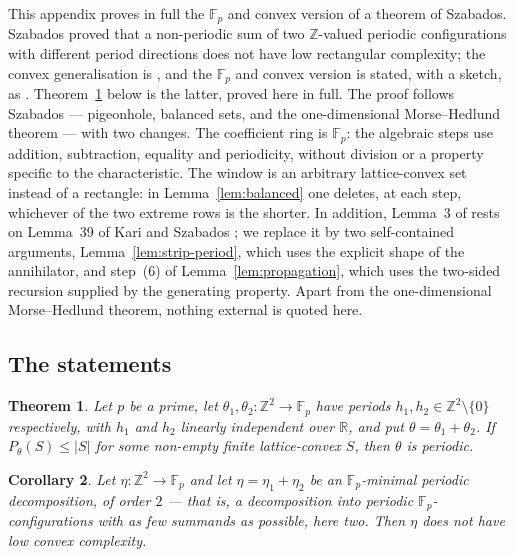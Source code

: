 \documentclass[11pt,reqno]{amsart}
\theoremstyle{plain}
\newtheorem{thm}{Theorem}[section]
\newtheorem{cor}[thm]{Corollary}
\theoremstyle{definition}
\theoremstyle{remark}
\theoremstyle{plain}
\theoremstyle{remark}
\theoremstyle{definition}
\numberwithin{equation}{section}
\newcommand{\R}{\mathbb{R}}
\newcommand{\Z}{\mathbb{Z}}
\newcommand{\Fp}{\mathbb{F}_p}
\begin{document}
This appendix proves in full the $\Fp$ and convex version of a theorem of
Szabados.  Szabados \cite[Theorem~1]{Sz} proved that a non-periodic sum of two $\Z$-valued
periodic configurations with different period directions does not have low
rectangular complexity; the convex generalisation is
\cite[Theorem~1.7]{Colle23a}, and the $\Fp$ and convex version is stated, with a
sketch, as \cite[Theorem~2.8]{CG}.  Theorem~\ref{thm:szabados} below is the
latter, proved here in full.  The proof follows Szabados \cite{Sz} —
pigeonhole, balanced sets, and the one-dimensional Morse--Hedlund theorem — with
two changes.  The coefficient ring is $\Fp$: the algebraic steps use addition,
subtraction, equality and periodicity, without division or a property specific
to the characteristic.  The window is an arbitrary lattice-convex set instead
of a rectangle: in
Lemma~\ref{lem:balanced} one deletes, at each step, whichever of the two extreme
rows is the shorter.  In addition, Lemma~3 of \cite{Sz} rests on Lemma~39 of
Kari and Szabados \cite{KS}; we replace it by two self-contained arguments,
Lemma~\ref{lem:strip-period}, which uses the explicit shape of the annihilator,
and step~(6) of Lemma~\ref{lem:propagation}, which uses the two-sided recursion
supplied by the generating property.  Apart from the one-dimensional
Morse--Hedlund theorem, nothing external is quoted here.

\setcounter{subsection}{-1}
\newpage
\subsection{The statements}\label{app:szab-statements}

\begin{thm}\label{thm:szabados}
Let $p$ be a prime, let $\theta_1,\theta_2\colon\Z^2\to\Fp$ have periods
$h_1,h_2\in\Z^2\setminus\{0\}$ respectively, with $h_1$ and $h_2$ linearly
independent over $\R$, and put $\theta=\theta_1+\theta_2$.  If $P_\theta(S)\le|S|$
for some non-empty finite lattice-convex $S$, then $\theta$ is periodic.
\end{thm}

\begin{cor}\label{cor:szabados}
Let $\eta\colon\Z^2\to\Fp$ and let $\eta=\eta_1+\eta_2$ be an $\Fp$-minimal
periodic decomposition, of order $2$ — that is, a decomposition into periodic
$\Fp$-configurations with as few summands as possible, here two.  Then $\eta$
does not have low convex complexity.
\end{cor}
\end{document}
